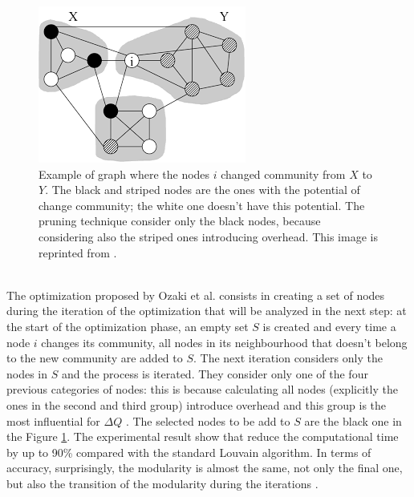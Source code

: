 \begin{figure}
	\centering
	\includegraphics[width=0.7\linewidth]{0-resources/pruning}
	\caption{Example of graph where the nodes $i$ changed community from $X$ to $Y$. The black and striped nodes are the ones with the potential of change community; the white one doesn't have this potential. The pruning technique consider only the black nodes, because considering also the striped ones introducing overhead. This image is reprinted from \cite{pruning}.}
	\label{fig:pruning}
\end{figure}\\
The optimization proposed by Ozaki et al. consists in creating a set of nodes during the iteration of the optimization that will be analyzed in the next step: at the start of the optimization phase, an empty set $S$ is created and every time a node $i$ changes its community, all nodes in its neighbourhood that doesn't belong to the new community are added to $S$. The next iteration considers only the nodes in $S$ and the process is iterated. They consider only one of the four previous categories of nodes: this is because calculating all nodes (explicitly the ones in the second and third group) introduce overhead and this group is the most influential for $\Delta Q$ \cite{pruning}. The selected nodes to be add to $S$ are the black one in the Figure \ref{fig:pruning}. 
The experimental result show that reduce the computational time by up to 90\% compared with the standard Louvain algorithm. In terms of accuracy, surprisingly, the modularity is almost the same,  not only the final one, but also the transition of the modularity during the iterations \cite{pruning}. 
